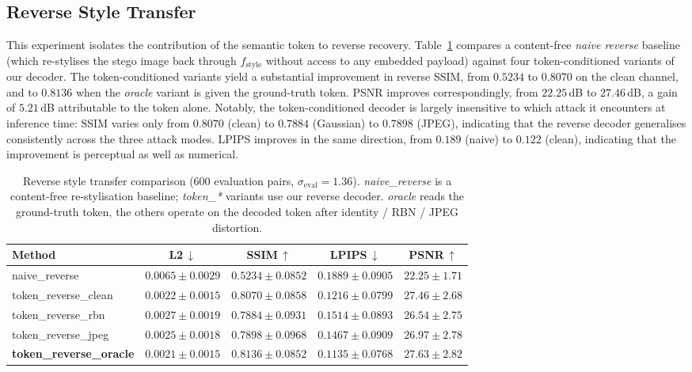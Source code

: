 \documentclass[runningheads]{llncs}
\begin{document}
\subsection{Reverse Style Transfer}
\label{sec:exp_reverse}
This experiment isolates the contribution of the semantic token to reverse recovery. Table~\ref{tab:reverse} compares a content-free \emph{naive reverse} baseline (which re-stylises the stego image back through $f_{\text{style}}$ without access to any embedded payload) against four token-conditioned variants of our decoder. The token-conditioned variants yield a substantial improvement in reverse SSIM, from $0.5234$ to $0.8070$ on the clean channel, and to $0.8136$ when the \emph{oracle} variant is given the ground-truth token. PSNR improves correspondingly, from $22.25$\,dB to $27.46$\,dB, a gain of $5.21$\,dB attributable to the token alone. Notably, the token-conditioned decoder is largely insensitive to which attack it encounters at inference time: SSIM varies only from $0.8070$ (clean) to $0.7884$ (Gaussian) to $0.7898$ (JPEG), indicating that the reverse decoder generalises consistently across the three attack modes. LPIPS improves in the same direction, from $0.189$ (naive) to $0.122$ (clean), indicating that the improvement is perceptual as well as numerical.

\begin{table}[t]
\centering
\caption{Reverse style transfer comparison ($600$ evaluation pairs, $\sigma_{\text{eval}}\!=\!1.36$). \textit{naive\_reverse} is a content-free re-stylisation baseline; \textit{token\_*} variants use our reverse decoder. \textit{oracle} reads the ground-truth token, the others operate on the decoded token after identity / RBN / JPEG distortion.}
\label{tab:reverse}
\setlength{\tabcolsep}{4pt}
\footnotesize
\begin{tabular}{lcccc}
\toprule
\textbf{Method} & \textbf{L2}\,$\downarrow$ & \textbf{SSIM}\,$\uparrow$ & \textbf{LPIPS}\,$\downarrow$ & \textbf{PSNR}\,$\uparrow$ \\
\midrule
naive\_reverse        & $0.0065\pm0.0029$ & $0.5234\pm0.0852$ & $0.1889\pm0.0905$ & $22.25\pm1.71$ \\
\rowcolor{rowshade}
token\_reverse\_clean & $0.0022\pm0.0015$ & $\mathbf{0.8070\pm0.0858}$ & $0.1216\pm0.0799$ & $\mathbf{27.46\pm2.68}$ \\
token\_reverse\_rbn   & $0.0027\pm0.0019$ & $0.7884\pm0.0931$ & $0.1514\pm0.0893$ & $26.54\pm2.75$ \\
\rowcolor{rowshade}
token\_reverse\_jpeg  & $0.0025\pm0.0018$ & $0.7898\pm0.0968$ & $0.1467\pm0.0909$ & $26.97\pm2.78$ \\
\textbf{token\_reverse\_oracle} & $0.0021\pm0.0015$ & $\mathbf{0.8136\pm0.0852}$ & $\mathbf{0.1135\pm0.0768}$ & $27.63\pm2.82$ \\
\bottomrule
\end{tabular}
\end{table}
\end{document}
